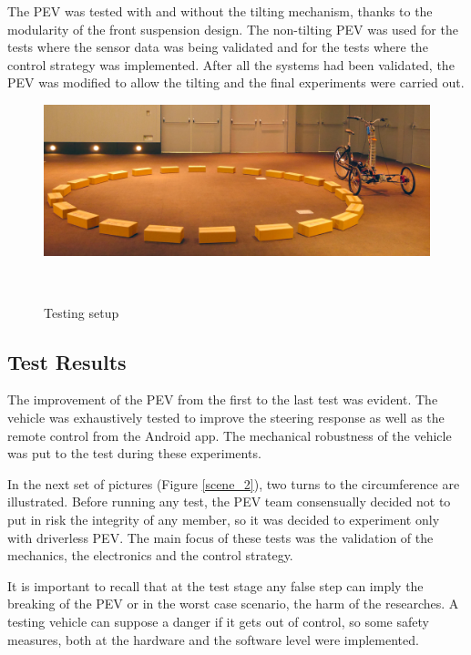 The PEV was tested with and without the tilting mechanism, thanks to the modularity of the front suspension design. The non-tilting PEV was used for the tests where the sensor data was being validated and for the tests where the control strategy was implemented. After all the systems had been validated, the PEV was modified to allow the tilting and the final experiments were carried out.
 
\begin{figure}[b]
	\includegraphics[width=1\linewidth]{figs/06/test_1}
	\caption{Testing setup}
	\\[-1.5cm]
\end{figure}

\newpage

\subsection{Test Results}

The improvement of the PEV from the first to the last test was evident. The vehicle was exhaustively tested to improve the steering response as well as the remote control from the Android app. The mechanical robustness of the vehicle was put to the test during these experiments.

In the next set of pictures (Figure \ref{scene_2}), two turns to the circumference are illustrated. Before running any test, the PEV team consensually decided not to put in risk the integrity of any member, so it was decided to experiment only with driverless PEV. The main focus of these tests was the validation of the mechanics, the electronics and the control strategy. 

It is important to recall that at the test stage any false step can imply the breaking of the PEV or in the worst case scenario, the harm of the researches. A testing vehicle can suppose a danger if it gets out of control, so some safety measures, both at the hardware and the software level were implemented.

